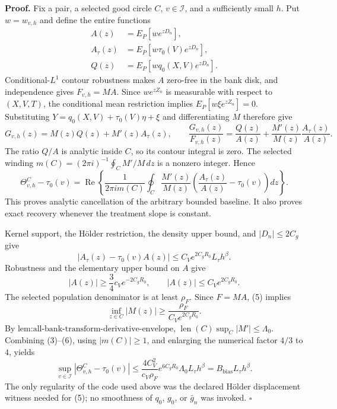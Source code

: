 \textbf{Proof.}
Fix a pair, a selected good circle \(C\), \(v\in\mathcal I\), and a sufficiently small \(h\).  Put \(w=w_{v,h}\) and define the entire functions
\[
 \begin{aligned}
 A(z)&=E_P[we^{zD_n}],\\
 A_\tau(z)&=E_P[w\tau_0(V)e^{zD_n}],\\
 Q(z)&=E_P[wq_0(X,V)e^{zD_n}].
 \end{aligned} \tag{1}
\]
Conditional-\(L^1\) contour robustness makes \(A\) zero-free in the bank disk, and independence gives \(F_{v,h}=MA\).  Since \(we^{zZ_n}\) is measurable with respect to \((X,V,T)\), the conditional mean restriction implies
\(E_P[w\xi e^{zZ_n}]=0\).  Substituting
\(Y=q_0(X,V)+\tau_0(V)\eta+\xi\) and differentiating \(M\) therefore give
\[
 G_{v,h}(z)=M(z)Q(z)+M'(z)A_\tau(z),
 \qquad
 \frac{G_{v,h}(z)}{F_{v,h}(z)}
 =\frac{Q(z)}{A(z)}+\frac{M'(z)}{M(z)}\frac{A_\tau(z)}{A(z)}. \tag{2}
\]
The ratio \(Q/A\) is analytic inside \(C\), so its contour integral is zero.  The selected winding
\(m(C)=(2\pi i)^{-1}\oint_C M'/M\,dz\) is a nonzero integer.  Hence
\[
 \Theta^C_{v,h}-\tau_0(v)
 =\operatorname{Re}\left\{
 \frac1{2\pi i m(C)}\oint_C\frac{M'(z)}{M(z)}
 \left(\frac{A_\tau(z)}{A(z)}-\tau_0(v)\right)dz
 \right\}. \tag{3}
\]
This proves analytic cancellation of the arbitrary bounded baseline.  It also proves exact recovery whenever the treatment slope is constant.

Kernel support, the H\"older restriction, the density upper bound, and \(|D_n|\le2C_g\) give
\[
 |A_\tau(z)-\tau_0(v)A(z)|
 \le C_Ve^{2C_gR_0}L_\tau h^\beta. \tag{4}
\]
Robustness and the elementary upper bound on \(A\) give
\[
 |A(z)|\ge\frac34c_Ve^{-2C_gR_0},
 \qquad |A(z)|\le C_Ve^{2C_gR_0}. \tag{5}
\]
The selected population denominator is at least \(\rho_F\).  Since \(F=MA\), (5) implies
\[
 \inf_{z\in C}|M(z)|
 \ge\frac{\rho_F}{C_Ve^{2C_gR_0}}. \tag{6}
\]
By \(\text{lem:all-bank-transform-derivative-envelope}\),
\(\operatorname{len}(C)\sup_C|M'|\le\Lambda_0\).  Combining (3)--(6), using \(|m(C)|\ge1\), and enlarging the numerical factor \(4/3\) to \(4\), yields
\[
 \sup_{v\in\mathcal I}|\Theta^C_{v,h}-\tau_0(v)|
 \le \frac{4C_V^2}{c_V\rho_F}e^{6C_gR_0}\Lambda_0
 L_\tau h^\beta
 =B_{\mathrm{bias}}L_\tau h^\beta. \tag{7}
\]
The only regularity of the code used above was the declared H\"older displacement witness needed for (5); no smoothness of \(q_0\), \(g_0\), or \(\bar g_n\) was invoked. \(\square\)